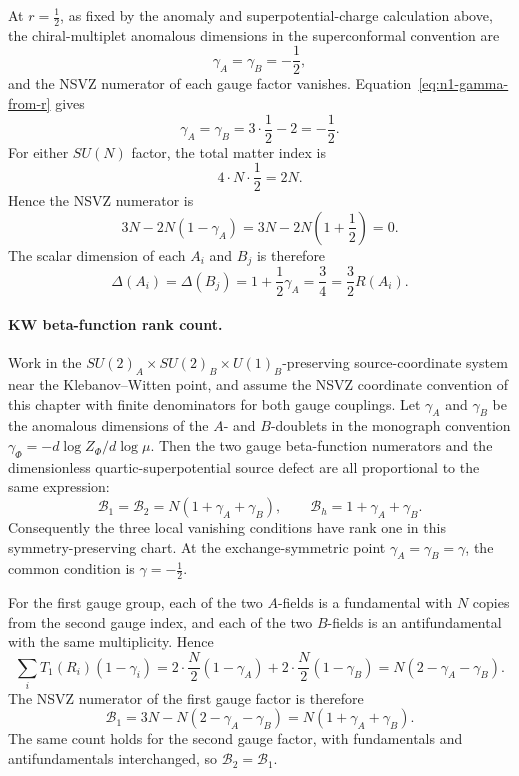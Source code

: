 \begin{remark}
\label{rem:kw-nsvz-numerator}
At \(r=\frac12\), as fixed by the anomaly and superpotential-charge
calculation above, the
chiral-multiplet anomalous dimensions in the superconformal convention are
\[
  \gamma_A=\gamma_B=-\frac12 ,
\]
and the NSVZ numerator of each gauge factor vanishes.
Equation~\eqref{eq:n1-gamma-from-r} gives
\[
  \gamma_A=\gamma_B=3\cdot\frac12-2=-\frac12 .
\]
For either \(SU(N)\) factor, the total matter index is
\[
  4\cdot N\cdot\frac12=2N.
\]
Hence the NSVZ numerator is
\[
  3N-2N(1-\gamma_A)
  =
  3N-2N\left(1+\frac12\right)
  =
  0 .
\]
The scalar dimension of each \(A_i\) and \(B_j\) is therefore
\[
  \Delta(A_i)=\Delta(B_j)=1+\frac12\gamma_A=\frac34
  =
  \frac32R(A_i).
\]
\end{remark}

\paragraph{KW beta-function rank count.}
Work in the \(SU(2)_A\times SU(2)_B\times U(1)_B\)-preserving source-coordinate system
near the Klebanov--Witten point, and assume the NSVZ coordinate convention of
this chapter with finite denominators for both gauge couplings.  Let
\(\gamma_A\) and \(\gamma_B\) be the anomalous dimensions of the \(A\)- and
\(B\)-doublets in the monograph convention
\(\gamma_\Phi=-d\log Z_\Phi/d\log\mu\).  Then the two gauge beta-function
numerators and the dimensionless quartic-superpotential source defect are all
proportional to the same expression:
\begin{equation}
  \mathcal B_1=\mathcal B_2=N(1+\gamma_A+\gamma_B),
  \qquad
  \mathcal B_h=1+\gamma_A+\gamma_B.
  \label{eq:kw-beta-rank-common-defect}
\end{equation}
Consequently the three local vanishing conditions have rank one in this
symmetry-preserving chart.  At the exchange-symmetric point
\(\gamma_A=\gamma_B=\gamma\), the common condition is
\(\gamma=-\frac12\).

For the first gauge group, each of the two \(A\)-fields is a fundamental with
\(N\) copies from the second gauge index, and each of the two \(B\)-fields is
an antifundamental with the same multiplicity.  Hence
\[
  \sum_iT_1(R_i)(1-\gamma_i)
  =
  2\cdot\frac N2(1-\gamma_A)
  +
  2\cdot\frac N2(1-\gamma_B)
  =
  N(2-\gamma_A-\gamma_B).
\]
The NSVZ numerator of the first gauge factor is therefore
\[
  \mathcal B_1
  =
  3N-N(2-\gamma_A-\gamma_B)
  =
  N(1+\gamma_A+\gamma_B).
\]
The same count holds for the second gauge factor, with fundamentals and
antifundamentals interchanged, so \(\mathcal B_2=\mathcal B_1\).


